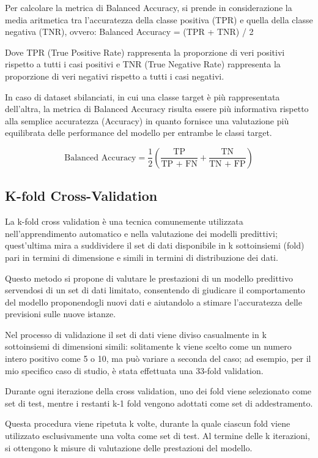 Per calcolare la metrica di Balanced Accuracy, si prende in considerazione la media aritmetica tra l'accuratezza della classe positiva (TPR) e quella della classe negativa (TNR), ovvero:
Balanced Accuracy = (TPR + TNR) / 2
 
Dove TPR (True Positive Rate) rappresenta la proporzione di veri positivi rispetto a tutti i casi positivi e TNR (True Negative Rate) rappresenta la proporzione di veri negativi rispetto a tutti i casi negativi.

In caso di dataset sbilanciati, in cui una classe target è più rappresentata dell'altra, la metrica di Balanced Accuracy risulta essere più informativa rispetto alla semplice accuratezza (Accuracy) in quanto fornisce una valutazione più equilibrata delle performance del modello per entrambe le classi target.

\begin{equation}
    \text{Balanced Accuracy} = \frac{1}{2} \left( \frac{\text{TP}}{\text{TP + FN}} + \frac{\text{TN}}{\text{TN + FP}} \right)
    \label{equation:18}
\end{equation}

\subsection{K-fold Cross-Validation}
La k-fold cross validation è una tecnica comunemente utilizzata nell'apprendimento automatico e nella valutazione dei modelli predittivi; quest’ultima mira a suddividere il set di dati disponibile in k sottoinsiemi (fold) pari in termini di dimensione e simili in termini di distribuzione dei dati. 

Questo metodo si propone di valutare le prestazioni di un modello predittivo servendosi di un set di dati limitato, consentendo di giudicare il comportamento del modello proponendogli nuovi dati e aiutandolo a stimare l'accuratezza delle previsioni sulle nuove istanze.

Nel processo di validazione il set di dati viene diviso casualmente in k sottoinsiemi di dimensioni simili: solitamente k viene scelto come un numero intero positivo come 5 o 10, ma può variare a seconda del caso; ad esempio, per il mio specifico caso di studio, è stata effettuata una 33-fold validation.

Durante ogni iterazione della cross validation, uno dei fold viene selezionato come set di test, mentre i restanti k-1 fold vengono adottati come set di addestramento. 

Questa procedura viene ripetuta k volte, durante la quale ciascun fold viene utilizzato esclusivamente una volta come set di test. Al termine delle k iterazioni, si ottengono k misure di valutazione delle prestazioni del modello.

